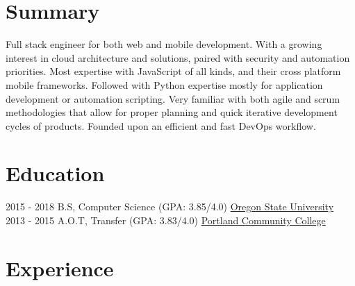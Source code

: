 \documentclass[letterpaper]{twentysecondcv} %
\begin{document}
\makeprofile %


\section{Summary}
    Full stack engineer for both web and mobile development. With a growing interest in cloud architecture and solutions, paired with security and automation priorities. 
    \newline \newline 
    Most expertise with JavaScript of all kinds, and their cross platform mobile frameworks. Followed with Python expertise mostly for application development or automation scripting.
    \newline \newline
    Very familiar with both agile and scrum methodologies that allow for proper planning and quick iterative development cycles of products. Founded upon an efficient and fast DevOps workflow. 
\section{Education}

\begin{twenty} %
	\twentyitem
    	{2015 - 2018 }
        {}
        {  B.S, Computer Science \textnormal{(GPA: 3.85/4.0)}}
        {\href{http://www.oregonstate.edu/}{Oregon State University}}
        {}
        {}
	\twentyitem
    	{2013 - 2015}
		{}
        {  A.O.T, Transfer \textnormal{(GPA: 3.83/4.0)}}
        {\href{https://www.pcc.edu/}{Portland Community College}}
        {}
        {}
\end{twenty}


\section{Experience}
\end{document}

